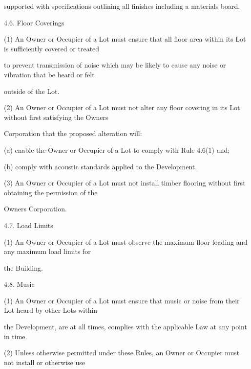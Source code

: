 \documentclass{article}
\begin{document}
{\fontsize{10.02}{1}supported with specifications outlining all finishes including a materials board. }

{\fontsize{9.99}{1}4.6. Floor Coverings }

{\fontsize{9.962}{1}(1) An Owner or Occupier of a Lot must ensure that all floor area within its Lot is sufficiently covered or treated }

{\fontsize{10.02}{1}to prevent transmission of noise which may be likely to cause any noise or vibration that be heard or felt }

{\fontsize{10.02}{1}outside of the Lot. }

{\fontsize{9.962}{1}(2) An Owner or Occupier of a Lot must not alter any floor covering in its Lot without first satisfying the Owners }

{\fontsize{10.02}{1}Corporation that the proposed alteration will: }

{\fontsize{9.962}{1}(a) enable the Owner or Occupier of a Lot to comply with Rule 4.6(1) and; }

{\fontsize{9.962}{1}(b) comply with acoustic standards applied to the Development. }

{\fontsize{9.962}{1}(3) An Owner or Occupier of a Lot must not install timber flooring without first obtaining the permission of the }

{\fontsize{10.02}{1}Owners Corporation. }

{\fontsize{9.99}{1}4.7. Load Limits }

{\fontsize{9.962}{1}(1) An Owner or Occupier of a Lot must observe the maximum floor loading and any maximum load limits for }

{\fontsize{10.02}{1}the Building. }

{\fontsize{9.99}{1}4.8. Music }

{\fontsize{9.962}{1}(1) An Owner or Occupier of a Lot must ensure that music or noise from their Lot heard by other Lots within }

{\fontsize{10.02}{1}the Development, are at all times, complies with the applicable Law at any point in time. }

\newpage


















{\fontsize{9.962}{1}(2) Unless otherwise permitted under these Rules, an Owner or Occupier must not install or otherwise use }
\end{document}
